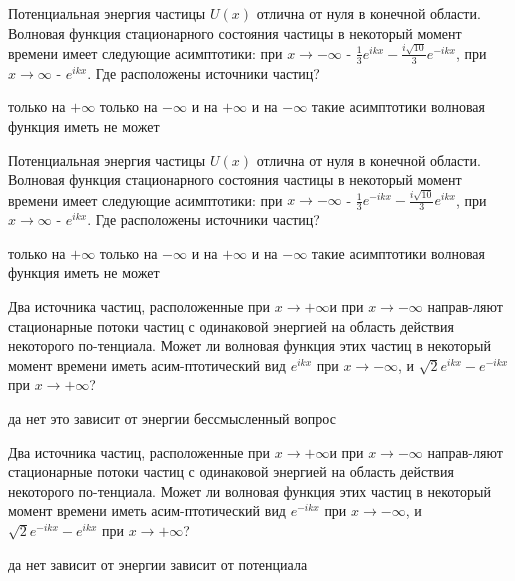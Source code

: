 \documentclass[11pt,a4paper]{exam}
\begin{document}
\begin{questions}
\question Потенциальная энергия частицы $U(x)$ отлична от нуля в конечной области. Волновая функция стационарного состояния частицы в некоторый момент времени имеет следующие асимптотики: при $x \to  - \infty $ - $\frac{1}{3}{e^{ikx}} - \frac{{i\sqrt {10} }}{3}{e^{ - ikx}}$, при $x \to \infty $ - ${e^{ikx}}$. Где расположены источники частиц?
\begin{choices}
\choice только на $ + \infty $        
\choice только на $ - \infty $
\choice и на $ + \infty $ и на $ - \infty $       
\choice такие асимптотики волновая функция иметь не может
\end{choices}

\question Потенциальная энергия частицы $U(x)$ отлична от нуля в конечной области. Волновая функция стационарного состояния частицы в некоторый момент времени имеет следующие асимптотики: при $x \to  - \infty $ - $\frac{1}{3}{e^{ - ikx}} - \frac{{i\sqrt {10} }}{3}{e^{ikx}}$, при $x \to \infty $ - ${e^{ikx}}$. Где расположены источники частиц?
\begin{choices}
\choice только на $ + \infty $        
\choice только на $ - \infty $
\choice и на $ + \infty $ и на $ - \infty $       
\choice такие асимптотики волновая функция иметь не может
\end{choices}

\question Два источника частиц, расположенные при $x \to  + \infty $и при $x \to  - \infty $ направ-ляют стационарные потоки частиц с одинаковой энергией на область действия некоторого по-тенциала. Может ли волновая функция этих частиц в некоторый момент времени иметь асим-птотический вид ${e^{ikx}}$ при $x \to  - \infty $, и $\sqrt 2 {e^{ikx}} - {e^{ - ikx}}$ при $x \to  + \infty $?
\begin{choices}
\choice да    
\choice нет      
\choice это зависит от энергии     
\choice бессмысленный вопрос
\end{choices}

\question Два источника частиц, расположенные при $x \to  + \infty $и при $x \to  - \infty $ направ-ляют стационарные потоки частиц с одинаковой энергией на область действия некоторого по-тенциала. Может ли волновая функция этих частиц в некоторый момент времени иметь асим-птотический вид ${e^{ - ikx}}$ при $x \to  - \infty $, и $\sqrt 2 {e^{ - ikx}} - {e^{ikx}}$ при $x \to  + \infty $?
\begin{choices}
\choice да    
\choice нет      
\choice зависит от энергии      
\choice зависит от потенциала
\end{choices}


\end{questions}
\end{document}
